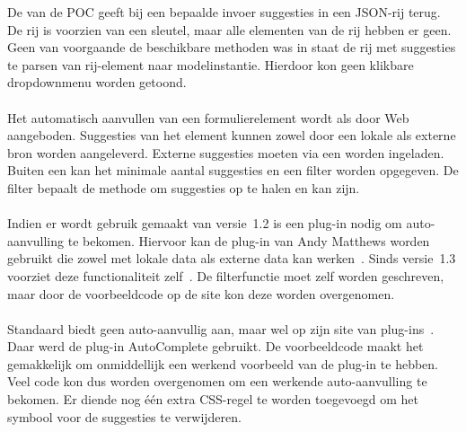 De  van de POC geeft bij een bepaalde invoer suggesties in een JSON-rij terug.
De rij is voorzien van een sleutel, maar alle elementen van de rij hebben er geen.
Geen van voorgaande de beschikbare methoden was in staat de rij met suggesties te parsen van rij-element naar modelinstantie.
Hierdoor kon geen klikbare dropdownmenu worden getoond.

\paragraph{\kendo}
Het automatisch aanvullen van een formulierelement wordt als  door \kendo{} Web aangeboden.
Suggesties van het element kunnen zowel door een lokale als externe bron worden aangeleverd.
Externe suggesties moeten via een  worden ingeladen.
Buiten een  kan het minimale aantal suggesties en een filter worden opgegeven.
De filter bepaalt de methode om suggesties op te halen en kan  zijn.

\paragraph{\jqm}
Indien er wordt gebruik gemaakt van versie~1.2 is een plug-in nodig om auto-aanvulling te bekomen.
Hiervoor kan de plug-in van Andy Matthews worden gebruikt die zowel met lokale data als externe data kan werken~\cite{Matthews2013}. 
Sinds versie~1.3 voorziet \jqm{} deze functionaliteit zelf~\cite{JQuery2013c}.
De filterfunctie moet zelf worden geschreven, maar door de voorbeeldcode op de site kon deze worden overgenomen.

\paragraph{\lungo}
Standaard biedt \lungo{} geen auto-aanvullig aan, maar wel op zijn site van plug-ins~\cite{TapQuo2013b}.
Daar werd de plug-in AutoComplete gebruikt.
De voorbeeldcode maakt het gemakkelijk om onmiddellijk een werkend voorbeeld van de plug-in te hebben.
Veel code kon dus worden overgenomen om een werkende auto-aanvulling te bekomen.
Er diende nog één extra CSS-regel te worden toegevoegd om het symbool voor de suggesties te verwijderen.



\subsection{}
\label{sec:evaluatie-gebruik-afbeelding}

